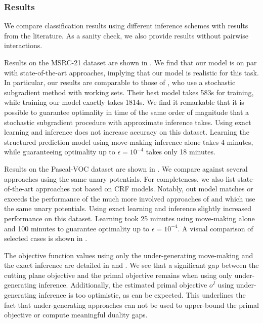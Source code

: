 

\subsubsection{Results}
We compare classification results using different inference schemes with
results from the literature. As a sanity check, we also provide results without
pairwise interactions.

Results on the MSRC-21 dataset are shown in .
We find that our model is on par with state-of-the-art approaches, implying
that our model is realistic for this task. In particular, our results are comparable to those of
\citet{lucchi2013learning}, who use a stochastic subgradient method with working sets.
Their best model takes 583s for training, while training our model exactly takes 1814s.
We find it remarkable that it is possible to guarantee optimality in time of
the same order of magnitude that a stochastic subgradient procedure with
approximate inference takes. Using exact learning and inference does not increase accuracy
on this dataset.
Learning the structured prediction model using move-making inference alone
takes 4 minutes, while guaranteeing optimality up to  $\epsilon=10^{-4}$
takes only 18 minutes.

Results on the Pascal-VOC dataset are shown in .
We compare against several approaches using the same unary potentials.
For completeness, we also list state-of-the-art approaches not based on CRF models.
Notably, out model matches or exceeds the performance of the much more involved approaches of
\citet{krahenbuhl2012efficient} and \citet{dann2012pottics} which use the same
unary potentials.
Using exact learning and inference slightly increased performance on this dataset.
Learning took 25 minutes using move-making alone and 100 minutes to guarantee optimality
up to $\epsilon=10^{-4}$.
A visual comparison of selected cases is shown in .


The objective function values using only the under-generating move-making and
the exact inference are detailed in  and .
We see that a significant gap between the cutting plane objective and the primal objective
remains when using only under-generating inference.
Additionally, the estimated primal objective $o^I$ using under-generating inference is
too optimistic, as can be expected. This underlines the fact that
under-generating approaches can not be used to upper-bound the primal
objective or compute meaningful duality gaps.

